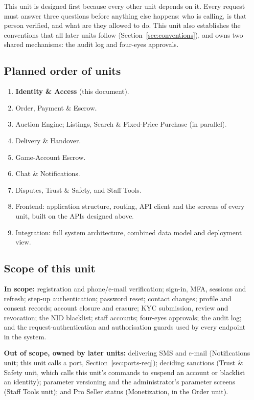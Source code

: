\documentclass[11pt,a4paper]{article}
\begin{document}
This unit is designed first because every other unit depends on it. Every request must answer three questions before anything else happens: who is calling, is that person verified, and what are they allowed to do. This unit also establishes the conventions that all later units follow (Section~\ref{sec:conventions}), and owns two shared mechanisms: the audit log and four-eyes approvals.

\subsection{Planned order of units}
\begin{enumerate}[nosep]
  \item \textbf{Identity \& Access} (this document).
  \item Order, Payment \& Escrow.
  \item Auction Engine; Listings, Search \& Fixed-Price Purchase (in parallel).
  \item Delivery \& Handover.
  \item Game-Account Escrow.
  \item Chat \& Notifications.
  \item Disputes, Trust \& Safety, and Staff Tools.
  \item Frontend: application structure, routing, API client and the screens of every unit, built on the APIs designed above.
  \item Integration: full system architecture, combined data model and deployment view.
\end{enumerate}

\subsection{Scope of this unit}
\textbf{In scope:} registration and phone/e-mail verification; sign-in, MFA, sessions and refresh; step-up authentication; password reset; contact changes; profile and consent records; account closure and erasure; KYC submission, review and revocation; the NID blacklist; staff accounts; four-eyes approvals; the audit log; and the request-authentication and authorisation guards used by every endpoint in the system.

\textbf{Out of scope, owned by later units:} delivering SMS and e-mail (Notifications unit; this unit calls a port, Section~\ref{sec:ports-req}); deciding sanctions (Trust \& Safety unit, which calls this unit's commands to suspend an account or blacklist an identity); parameter versioning and the administrator's parameter screens (Staff Tools unit); and Pro Seller status (Monetization, in the Order unit).
\end{document}
